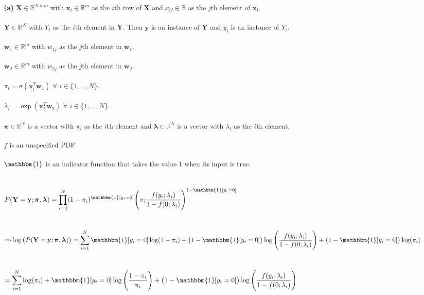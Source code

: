 \documentclass[submit]{harvardml}
\newcommand{\R}{\mathbb{R}}
\begin{document}
\textbf{(a)} $\mathbf{X}\in\R^{N\times m}$ with $\mathbf{x}_i\in\R^m$ as the $i$th row of $\mathbf{X}$ and $x_{ij}\in\R$ as the $j$th element of $\mathbf{x}_i$.\\\\
$\mathbf{Y}\in\R^N$ with $Y_i$ as the $i$th element in $\mathbf{Y}$. Then $\mathbf{y}$ is an instance of $\mathbf{Y}$ and $y_i$ is an instance of $Y_i$.\\\\
$\mathbf{w}_1\in\R^m$ with $w_{1j}$ as the $j$th element in $\mathbf{w}_1$.\\\\
$\mathbf{w}_2\in\R^m$ with $w_{2j}$ as the $j$th element in $\mathbf{w}_2$.\\\\
$\pi_i=\sigma(\mathbf{x}_i^T\mathbf{w}_1)$ $\forall$ $i\in\{1,...,N\}$.\\\\
$\lambda_i=\exp(\mathbf{x}_i^T\mathbf{w}_2)$ $\forall$ $i\in\{1,...,N\}$.\\\\
$\bm{\pi}\in\R^N$ is a vector with $\pi_i$ as the $i$th element and $\bm{\lambda}\in\R^N$ is a vector with $\lambda_i$ as the $i$th element.\\\\
$f$ is an unspecified PDF.\\\\
$\mathbbm{1}$ is an indicator function that takes the value $1$ when its input is true.\\\\\\
$P(\mathbf{Y}=\mathbf{y};\bm{\pi},\bm{\lambda})=\displaystyle\prod_{i=1}^{N}(1-\pi_i)^{\mathbbm{1}[y_i=0]}\Bigg(\pi_i\dfrac{f(y_i;\lambda_i)}{1-f(0;\lambda_i)}\Bigg)^{1-\mathbbm{1}[y_i=0]}$\\\\\\
$\Rightarrow\log\big(P(\mathbf{Y}=\mathbf{y};\bm{\pi},\bm{\lambda})\big)=\displaystyle\sum_{i=1}^{N}\mathbbm{1}[y_i=0]\log(1-\pi_i)+\big(1-\mathbbm{1}[y_i=0]\big)\log\Bigg(\dfrac{f(y_i;\lambda_i)}{1-f(0;\lambda_i)}\Bigg)+\big(1-\mathbbm{1}[y_i=0]\big)\log(\pi_i)$\\\\\\
$=\displaystyle\sum_{i=1}^{N}\log(\pi_i)+\mathbbm{1}[y_i=0]\log\Bigg(\dfrac{1-\pi_i}{\pi_i}\Bigg)+\big(1-\mathbbm{1}[y_i=0]\big)\log\Bigg(\dfrac{f(y_i;\lambda_i)}{1-f(0;\lambda_i)}\Bigg)$\\\\\\
\end{document}
